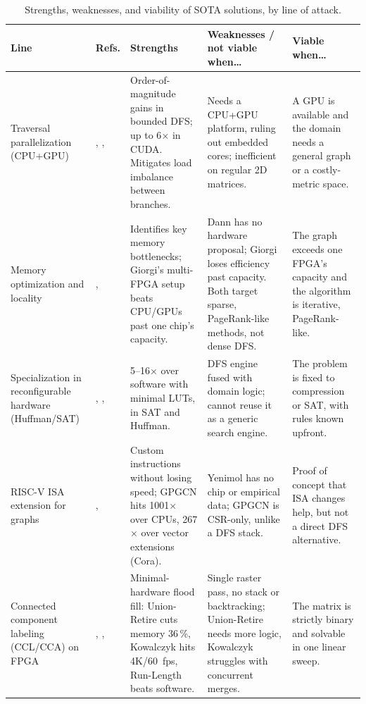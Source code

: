 \documentclass[conference]{IEEEtran}
\begin{document}
\begin{table}[t]
\centering
\footnotesize
\caption{Strengths, weaknesses, and viability of SOTA solutions, by line of attack.}
\label{tab:sota_fortalezas}
\renewcommand{\arraystretch}{1.0}
\begin{tabular}{@{}p{2.6cm}p{0.9cm}p{4.6cm}p{4.6cm}p{4.0cm}@{}}
\toprule
\textbf{Line} & \textbf{Refs.} & \textbf{Strengths} & \textbf{Weaknesses / not viable when\ldots} & \textbf{Viable when\ldots} \\
\midrule
 
Traversal parallelization (CPU+GPU)
& \cite{futuhi2025}, \cite{naumov2017}, \cite{yuan2024}
& Order-of-magnitude gains in bounded DFS; up to 6$\times$ in CUDA. Mitigates load imbalance between branches.
& Needs a CPU+GPU platform, ruling out embedded cores; inefficient on regular 2D matrices.
& A GPU is available and the domain needs a general graph or a costly-metric space. \\

Memory optimization and locality
& \cite{giorgi2023}, \cite{dann2021}
& Identifies key memory bottlenecks; Giorgi's multi-FPGA setup beats CPU/GPUs past one chip's capacity.
& Dann has no hardware proposal; Giorgi loses efficiency past capacity. Both target sparse, PageRank-like methods, not dense DFS.
& The graph exceeds one FPGA's capacity and the algorithm is iterative, PageRank-like. \\

Specialization in reconfigurable hardware (Huffman/SAT)
& \cite{mukherji2025}, \cite{article}, \cite{microsoftsat}
& 5--16$\times$ over software with minimal LUTs, in SAT and Huffman.
& DFS engine fused with domain logic; cannot reuse it as a generic search engine.
& The problem is fixed to compression or SAT, with rules known upfront. \\

RISC-V ISA extension for graphs
& \cite{yenimol2022}, \cite{tang2022gpgcn}
& Custom instructions without losing speed; GPGCN hits 1001$\times$ over CPUs, 267$\times$ over vector extensions (Cora).
& Yenimol has no chip or empirical data; GPGCN is CSR-only, unlike a DFS stack.
& Proof of concept that ISA changes help, but not a direct DFS alternative. \\

Connected component labeling (CCL/CCA) on FPGA
& \cite{bailey2022unionretire}, \cite{kowalczyk2021ccl4k}, \cite{appiah2008runlength}
& Minimal-hardware flood fill: Union-Retire cuts memory 36\,\%, Kowalczyk hits 4K/60~fps, Run-Length beats software.
& Single raster pass, no stack or backtracking; Union-Retire needs more logic, Kowalczyk struggles with concurrent merges.
& The matrix is strictly binary and solvable in one linear sweep. \\


\end{tabular}
\end{table}
\end{document}
